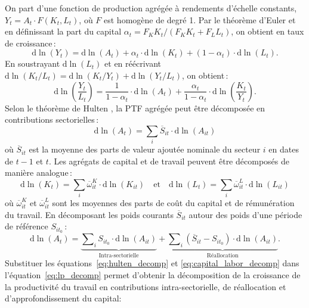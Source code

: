 \documentclass[11pt, letterpaper]{article}
\begin{document}
On part d'une fonction de production agrégée à rendements d'échelle constants, $Y_t = A_t \cdot F(K_t, L_t)$, où $F$ est homogène de degré 1. Par le théorème d'Euler et en définissant la part du capital $\alpha_t = F_K K_t / (F_K K_t + F_L L_t)$, on obtient en taux de croissance\,:
\begin{equation*}
   \mathrm{d}\ln(Y_t) = \mathrm{d}\ln(A_t) + \alpha_t \cdot \mathrm{d}\ln(K_t) + (1 - \alpha_t) \cdot \mathrm{d}\ln(L_t).
\end{equation*}
En soustrayant $\mathrm{d}\ln(L_t)$ et en réécrivant $\mathrm{d}\ln(K_t / L_t) = \mathrm{d}\ln(K_t / Y_t) + \mathrm{d}\ln(Y_t / L_t)$, on obtient\,:
\begin{equation}
   \label{eq:lp_decomp}
   \mathrm{d}\ln\left(\frac{Y_t}{L_t}\right) = \frac{1}{1 - \alpha_t} \cdot \mathrm{d}\ln(A_t) + \frac{\alpha_t}{1 - \alpha_t} \cdot \mathrm{d}\ln\left(\frac{K_t}{Y_t}\right).
\end{equation}
Selon le théorème de Hulten \citep{Hulten_1978}, la PTF agrégée peut être décomposée en contributions sectorielles\,:
\begin{equation}
   \label{eq:tfp_decomp}
   \mathrm{d}\ln(A_t) = \sum_i \overline{S}_{it} \cdot \mathrm{d}\ln(A_{it})
\end{equation}
où $\overline{S}_{it}$ est la moyenne des parts de valeur ajoutée nominale du secteur $i$ en dates de $t-1$ et $t$. Les agrégats de capital et de travail peuvent être décomposés de manière analogue\,: 
\begin{equation}
   \label{eq:capital_labor_decomp}
   \mathrm{d}\ln(K_t) = \sum_i \overline{\omega}^K_{it} \cdot \mathrm{d}\ln (K_{it}) \quad \text{et} \quad \mathrm{d}\ln(L_t) = \sum_i \overline{\omega}^L_{it} \cdot \mathrm{d}\ln (L_{it})
\end{equation}
où $\overline{\omega}^K_{it}$ et $\overline{\omega}^L_{it}$ sont les moyennes des parts de coût du capital et de rémunération du travail. En décomposant les poids courants $\overline{S}_{it}$ autour des poids d'une période de référence $S_{it_0}$\,:
\begin{equation}
   \label{eq:hulten_decomp}
   \mathrm{d}\ln(A_t) = \underbrace{\sum\nolimits_i S_{it_0} \cdot \mathrm{d}\ln(A_{it})}_{\text{Intra-sectorielle}} + \underbrace{\sum\nolimits_i (\overline{S}_{it} - S_{it_0}) \cdot \mathrm{d}\ln(A_{it})}_{\text{Réallocation}}.
\end{equation}
Substituer les équations~\eqref{eq:hulten_decomp} et \eqref{eq:capital_labor_decomp} dans l'équation~\eqref{eq:lp_decomp} permet d'obtenir la décomposition de la croissance de la productivité du travail en contributions intra-sectorielle, de réallocation et d'approfondissement du capital:
\end{document}
